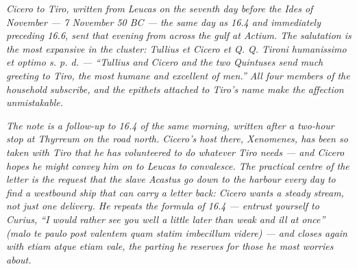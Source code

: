 
\textit{Cicero to Tiro, written from Leucas on the seventh day
before the Ides of November --- 7 November 50 BC --- the same
day as 16.4 and immediately preceding 16.6, sent that evening
from across the gulf at Actium. The salutation is the most
expansive in the cluster: \textit{Tullius et Cicero et Q. Q.
Tironi humanissimo et optimo s. p. d.} --- ``Tullius and
Cicero and the two Quintuses send much greeting to Tiro, the
most humane and excellent of men.'' All four members of the
household subscribe, and the epithets attached to Tiro's name
make the affection unmistakable.}

\textit{The note is a follow-up to 16.4 of the same morning,
written after a two-hour stop at Thyrreum on the road north.
Cicero's host there, Xenomenes, has been so taken with Tiro
that he has volunteered to do whatever Tiro needs --- and
Cicero hopes he might convey him on to Leucas to convalesce.
The practical centre of the letter is the request that the
slave Acastus go down to the harbour every day to find a
westbound ship that can carry a letter back: Cicero wants a
steady stream, not just one delivery. He repeats the formula
of 16.4 --- entrust yourself to Curius, ``I would rather see
you well a little later than weak and ill at once''
(\textit{malo te paulo post valentem quam statim imbecillum
videre}) --- and closes again with \textit{etiam atque etiam
vale}, the parting he reserves for those he most worries
about.}
